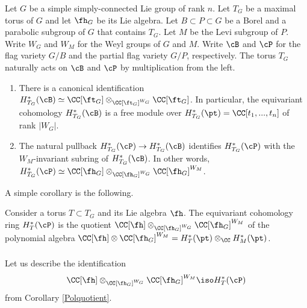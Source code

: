 \documentclass[12pt]{amsart}
\begin{document}
Let $G$ be a simple simply-connected Lie group of rank $n$. Let $T_G$ be a maximal torus of $G$ and let $\fh_G$ be its Lie algebra. Let $B \subset P\subset G$ be a Borel and a parabolic subgroup of $G$ that contains $T_G$. Let $M$ be the Levi subgroup of $P$. Write $W_G$ and $W_M$ for the Weyl groups of $G$ and $M$. Write $\cB$ and $\cP$ for the flag variety $G/B$ and the partial flag variety $G/P$, respectively. The torus $T_G$ naturally acts on $\cB$ and $\cP$ by multiplication from the left. %
\begin{prop}\cite[Section 5]{Kaji2015}\label{general equicoh} \leavevmode
    \begin{enumerate}
        \item There is a canonical identification $H^*_{T_G}(\cB)\simeq \CC[\ft_G]\otimes_{\CC[\ft_G]^{W_G}} \CC[\ft_G]$. In particular, the equivariant cohomology $H^*_{T_G}(\cB)$ is a free module over $H^*_{T_G}(\pt) = \CC[t_1,...,t_n]$ of rank $|W_G|$.
        \item The natural pullback $H^*_{T_G}(\cP)\rightarrow H^*_{T_G}(\cB)$ identifies $H^*_{T_G}(\cP)$ with the $W_M$-invariant subring of $H^*_{T_G}(\cB)$. In other words, $H^*_{T_G}(\cP)\simeq \CC[\fh_G]\otimes_{\CC[\fh_G]^{W_G}} \CC[\fh_G]^{W_M}$.
    \end{enumerate}
\end{prop}
A simple corollary is the following.
\begin{cor} \label{Polquotient}
    Consider a torus $T\subset T_G$ and its Lie algebra $\fh$. The equivariant cohomology ring $H^*_{T}(\cP)$ is the quotient $\CC[\fh]\otimes_{\CC[\fh_G]^{W_G}} \CC[\fh_G]^{W_M}$ of the polynomial algebra $\CC[\fh]\otimes \CC[\fh_G]^{W_M}= H^*_{T}(\pt)\otimes_\CC H^*_{M}(\pt)$.
\end{cor}




\subsubsection{}\label{descr_gen_rel_equiv_cohom_partial_via_chern}  Let us  describe the identification 
\begin{equation}\label{equiv_cohom_partial_flags_descr}
\CC[\fh]\otimes_{\CC[\fh_G]^{W_G}} \CC[\fh_G]^{W_M} \iso H^*_{T}(\cP)
\end{equation}
from Corollary \ref{Polquotient}.
\end{document}
